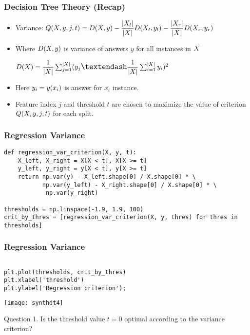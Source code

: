 \begin{frame}[fragile]\frametitle{Decision Tree Theory (Recap)}	
\begin{itemize}
\item Variance: $\large Q(X, y, j, t) = D(X, y) - \dfrac{|X_l|}{|X|} D(X_l, y_l) - \dfrac{|X_r|}{|X|} D(X_r, y_r)$
\item Where $\large D(X, y)$ is variance of answers  $y$  for all instances in $\large X$ 

$\large D(X) = \dfrac{1}{|X|} \sum_{j=1}^{|X|}(y_j – \dfrac{1}{|X|}\sum_{i = 1}^{|X|}y_i)^2$

\item Here $\large y_i = y(x_i)$ is answer for $x_i$ instance.

\item Feature index $j$  and threshold  $t$  are chosen to maximize the value of criterion  $\large Q(X, y, j, t)$ for each split.
\end{itemize}
\end{frame}

\begin{frame}[fragile]\frametitle{Regression Variance}	
\begin{lstlisting}
def regression_var_criterion(X, y, t):
    X_left, X_right = X[X < t], X[X >= t]
    y_left, y_right = y[X < t], y[X >= t]
    return np.var(y) - X_left.shape[0] / X.shape[0] * \
           np.var(y_left) - X_right.shape[0] / X.shape[0] * \
            np.var(y_right)
			
thresholds = np.linspace(-1.9, 1.9, 100)
crit_by_thres = [regression_var_criterion(X, y, thres) for thres in thresholds]

\end{lstlisting}

\end{frame}

\begin{frame}[fragile]\frametitle{Regression Variance}	
\begin{lstlisting}

plt.plot(thresholds, crit_by_thres)
plt.xlabel('threshold')
plt.ylabel('Regression criterion');			
\end{lstlisting}
\begin{center}
\texttt{[image: synthdt4]}
\end{center}

Question 1. Is the threshold value $t=0$  optimal according to the variance criterion?
\end{frame}

